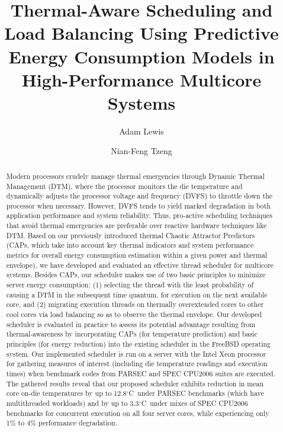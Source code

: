 \documentclass[times, 10pt,twocolumn]{IEEEtran}
\begin{document}
\title{Thermal-Aware Scheduling and Load Balancing Using Predictive
  Energy Consumption Models in High-Performance Multicore Systems} 
\author[]{Adam  Lewis} 
\author[]{Nian-Feng Tzeng} 
\maketitle
\newtheorem{defn}{Definition}
\newtheorem{thm}{Theorem}
\thispagestyle{empty}
\begin{abstract}
  Modern processors crudely manage thermal emergencies through Dynamic
  Thermal Management (DTM), where the processor monitors the die
  temperature and dynamically adjusts the processor voltage and
  frequency (DVFS) to throttle down the processor when
  necessary. However, DVFS tends to yield marked degradation in both
  application performance and system reliability. Thus, pro-active
  scheduling techniques that avoid thermal emergencies are preferable
  over reactive hardware techniques like DTM.  Based on our previously
  introduced thermal Chaotic Attractor Predictors (CAPs, which take into
  account key thermal indicators and system performance metrics for
  overall energy consumption estimation within a given power and thermal
  envelope), we have developed and evaluated an effective thread
  scheduler for multicore systems.  Besides CAPs, our scheduler makes
  use of two basic principles to minimize server energy consumption: (1)
  selecting the thread with the least probability of causing a DTM in
  the subsequent time quantum, for execution on the next available core,
  and (2) migrating execution threads on thermally overextended cores to
  other cool cores via load balancing so as to observe the thermal
  envelope.  Our developed scheduler is evaluated in practice to assess
  its potential advantage resulting from thermal-awareness by
  incorporating CAPs (for temperature prediction) and basic principles
  (for energy reduction) into the existing scheduler in the FreeBSD
  operating system.  Our implemented scheduler is run on a server with
  the Intel Xeon processor for gathering measures of interest (including
  die temperature readings and execution times) when benchmark codes
  from PARSEC and SPEC CPU2006 suites are executed.  The gathered
  results reveal that our proposed scheduler exhibits reduction in mean
  core on-die temperatures by up to 12.8$^{\circ}$C\ under PARSEC
  benchmarks (which have multithreaded workloads) and by up to 3.3$^{\circ}$C\
  under mixes of SPEC CPU2006 benchmarks for concurrent  
  execution on all four server cores, while experiencing
  only 1\% to 4\% performance degradation.
\end{abstract}
\end{document}
